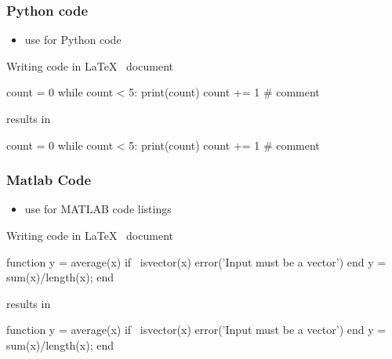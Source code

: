 \documentclass[report,english]{enacom}
\begin{document}
\subsubsection{Python code}
    \begin{itemize}
        \item use  for Python code
    \end{itemize}
    Writing code in \LaTeX~ document
    \begin{lcode}
    \begin{pycode}
        count = 0
        while count < 5:
        print(count)
        count += 1  # comment
    \end{pycode}
    \end{lcode}
    results in
    \begin{pycode}
        count = 0
        while count < 5:
            print(count)
            count += 1  # comment
    \end{pycode}

\subsubsection{Matlab Code}
    \begin{itemize}
        \item use  for MATLAB code listings
    \end{itemize}
    Writing code in \LaTeX ~ document
    \begin{lcode}
    \begin{mcode}
        function y = average(x)
            if ~isvector(x)
                error('Input must be a vector')
            end
            y = sum(x)/length(x); 
        end
    \end{mcode}
    \end{lcode}
    results in
    \begin{mcode}
	    function y = average(x)
    	if ~isvector(x)
        	error('Input must be a vector')
    	end
    	y = sum(x)/length(x); 
    	end
    \end{mcode}
\end{document}
